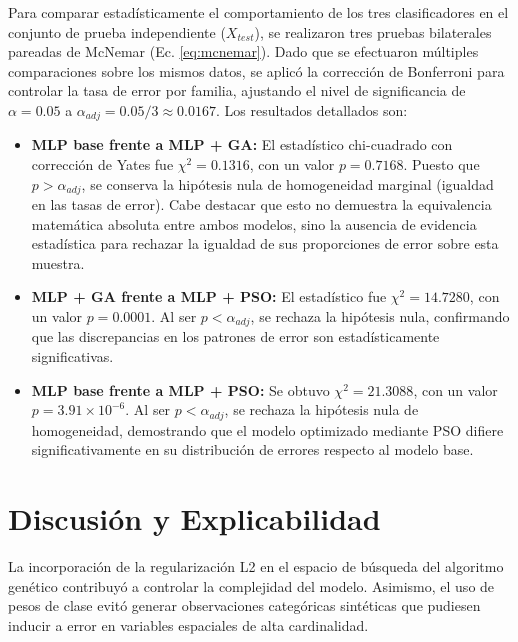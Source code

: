 \documentclass[conference]{IEEEtran}
\begin{document}
Para comparar estadísticamente el comportamiento de los tres clasificadores en el conjunto de prueba independiente ($X_{test}$), se realizaron tres pruebas bilaterales pareadas de McNemar (Ec. \ref{eq:mcnemar}). Dado que se efectuaron múltiples comparaciones sobre los mismos datos, se aplicó la corrección de Bonferroni para controlar la tasa de error por familia, ajustando el nivel de significancia de $\alpha = 0.05$ a $\alpha_{adj} = 0.05 / 3 \approx 0.0167$. Los resultados detallados son:
\begin{itemize}
    \item \textbf{MLP base frente a MLP + GA:} El estadístico chi-cuadrado con corrección de Yates fue $\chi^2 = 0.1316$, con un valor $p=0.7168$. Puesto que $p > \alpha_{adj}$, se conserva la hipótesis nula de homogeneidad marginal (igualdad en las tasas de error). Cabe destacar que esto no demuestra la equivalencia matemática absoluta entre ambos modelos, sino la ausencia de evidencia estadística para rechazar la igualdad de sus proporciones de error sobre esta muestra.
    \item \textbf{MLP + GA frente a MLP + PSO:} El estadístico fue $\chi^2 = 14.7280$, con un valor $p=0.0001$. Al ser $p < \alpha_{adj}$, se rechaza la hipótesis nula, confirmando que las discrepancias en los patrones de error son estadísticamente significativas.
    \item \textbf{MLP base frente a MLP + PSO:} Se obtuvo $\chi^2 = 21.3088$, con un valor $p=3.91\times10^{-6}$. Al ser $p < \alpha_{adj}$, se rechaza la hipótesis nula de homogeneidad, demostrando que el modelo optimizado mediante PSO difiere significativamente en su distribución de errores respecto al modelo base.
\end{itemize}

\section{Discusión y Explicabilidad}
La incorporación de la regularización L2 en el espacio de búsqueda del algoritmo genético contribuyó a controlar la complejidad del modelo. Asimismo, el uso de pesos de clase evitó generar observaciones categóricas sintéticas que pudiesen inducir a error en variables espaciales de alta cardinalidad.
\end{document}
